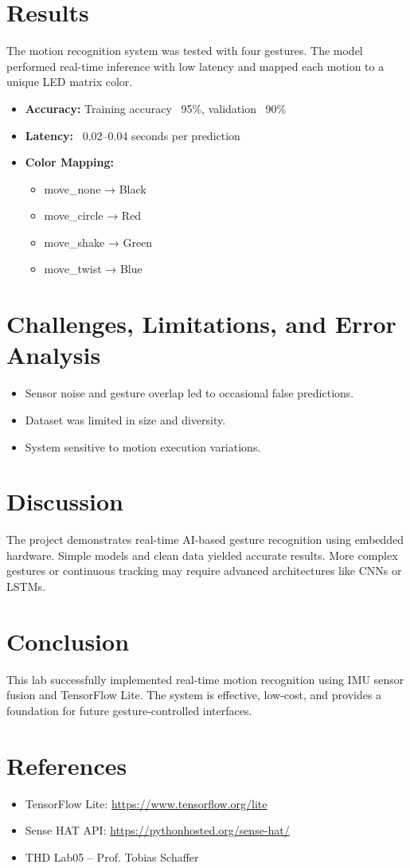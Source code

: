 \documentclass[a4paper,12pt]{article}
\begin{document}
\section{Results}
The motion recognition system was tested with four gestures. The model performed real-time inference with low latency and mapped each motion to a unique LED matrix color.

\begin{itemize}
    \item \textbf{Accuracy:} Training accuracy ~95\%, validation ~90\%
    \item \textbf{Latency:} ~0.02–0.04 seconds per prediction
    \item \textbf{Color Mapping:}
    \begin{itemize}
        \item move\_none → Black
        \item move\_circle → Red
        \item move\_shake → Green
        \item move\_twist → Blue
    \end{itemize}
\end{itemize}

\section{Challenges, Limitations, and Error Analysis}
\begin{itemize}
    \item Sensor noise and gesture overlap led to occasional false predictions.
    \item Dataset was limited in size and diversity.
    \item System sensitive to motion execution variations.
\end{itemize}

\section{Discussion}
The project demonstrates real-time AI-based gesture recognition using embedded hardware. Simple models and clean data yielded accurate results. More complex gestures or continuous tracking may require advanced architectures like CNNs or LSTMs.

\section{Conclusion}
This lab successfully implemented real-time motion recognition using IMU sensor fusion and TensorFlow Lite. The system is effective, low-cost, and provides a foundation for future gesture-controlled interfaces.

\section{References}
\begin{itemize}
    \item TensorFlow Lite: \url{https://www.tensorflow.org/lite}
    \item Sense HAT API: \url{https://pythonhosted.org/sense-hat/}
    \item THD Lab05 – Prof. Tobias Schaffer
\end{itemize}
\end{document}
